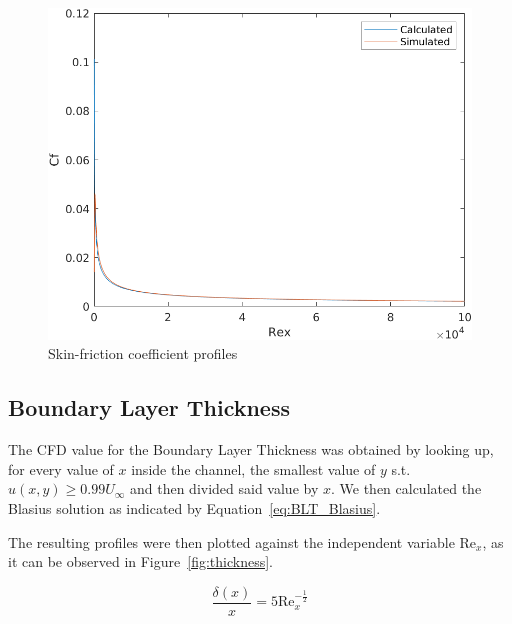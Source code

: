 \documentclass[12pt]{article}
\begin{document}
        \begin{figure}[ht!]
                \centering
                \includegraphics[width=\textwidth]{Skin_Friction.png}
                \caption{Skin-friction coefficient profiles}
                \label{fig:skin_friction}
        \end{figure}

        \subsection{Boundary Layer Thickness}

                The CFD value for the Boundary Layer Thickness was obtained by looking up, for every value of $ x $ inside the channel, the smallest value of \( y \) s.t. \( u(x,y) \ge 0.99 U_{\infty} \) and then divided said value by $ x $. We then calculated the Blasius solution as indicated by Equation~\ref{eq:BLT_Blasius}.

                The resulting profiles were then plotted against the independent variable $ \text{Re}_x $, as it can be observed in Figure~\ref{fig:thickness}.

                \begin{equation} \label{eq:BLT_Blasius}
                        \frac{\delta(x)}{x} = 5 \text{Re}_x^{-\frac{1}{2}}
                \end{equation}
\end{document}
